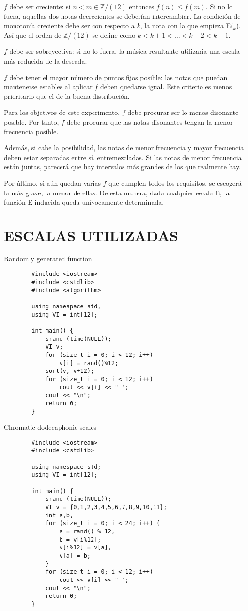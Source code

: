 		$f$ debe ser creciente: si $n<m\in\mathbb{Z}/(12)$ entonces $f(n)\leq f(m)$. Si no lo fuera, aquellas dos notas decrecientes se deberían intercambiar. La condición de monotonía creciente debe ser con respecto a $k$, la nota con la que empieza E($_k$). Así que el orden de $\mathbb{Z}/(12)$ se define como $k<k+1<\ldots<k-2<k-1$.
		
		$f$ debe ser sobreyectiva: si no lo fuera, la música resultante utilizaría una escala más reducida de la deseada.
		
		$f$ debe tener el mayor número de puntos fijos posible: las notas que puedan mantenerse estables al aplicar $f$ deben quedarse igual. Este criterio es menos prioritario que el de la buena distribución.
		
		Para los objetivos de este experimento, $f$ debe procurar ser lo menos disonante posible. Por tanto, $f$ debe procurar que las notas disonantes tengan la menor frecuencia posible.
		
		Además, si cabe la posibilidad, las notas de menor frecuencia y mayor frecuencia deben estar separadas entre sí, entremezcladas. Si las notas de menor frecuencia están juntas, parecerá que hay intervalos más grandes de los que realmente hay.
				
		Por último, si aún quedan varias $f$ que cumplen todos los requisitos, se escogerá la más grave, la menor de ellas. De esta manera, dada cualquier escala E, la función E-inducida queda unívocamente determinada.
		
	\section{ESCALAS UTILIZADAS}

        Randomly generated function
        \begin{lstlisting}
        #include <iostream>
        #include <cstdlib>
        #include <algorithm>
        
        using namespace std;
        using VI = int[12];
        
        int main() {
        	srand (time(NULL));
        	VI v;
        	for (size_t i = 0; i < 12; i++)
        		v[i] = rand()%12;
        	sort(v, v+12);
        	for (size_t i = 0; i < 12; i++)
        		cout << v[i] << " ";
        	cout << "\n";
        	return 0;
        }        
        \end{lstlisting}

        Chromatic dodecaphonic scales
        \begin{lstlisting}
        #include <iostream>
        #include <cstdlib>
        
        using namespace std;
        using VI = int[12];
        
        int main() {
        	srand (time(NULL));
        	VI v = {0,1,2,3,4,5,6,7,8,9,10,11};
        	int a,b;
        	for (size_t i = 0; i < 24; i++) {
        		a = rand() % 12;
        		b = v[i%12];
        		v[i%12] = v[a];
        		v[a] = b;
        	}
        	for (size_t i = 0; i < 12; i++)
        		cout << v[i] << " ";
        	cout << "\n";
        	return 0;
        }        
        \end{lstlisting}

